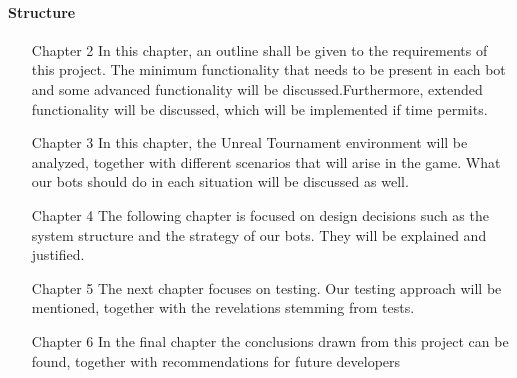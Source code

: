 \paragraph{Structure}

\begin{enumerate}
\item[Chapter 2] In this chapter, an outline shall be given to the requirements of this project. The minimum functionality that needs to be present in each bot and some advanced functionality will be discussed.Furthermore, extended functionality will be discussed, which will be implemented if time permits.

\item[Chapter 3] In this chapter, the Unreal Tournament environment will be analyzed, together with different scenarios that will arise in the game. What our bots should do in each situation will be discussed as well.

\item[Chapter 4] The following chapter is focused on design decisions such as the system structure and the strategy of our bots. They will be explained and justified.

\item[Chapter 5] The next chapter focuses on testing. Our testing approach will be mentioned, together with the revelations stemming from tests.

\item[Chapter 6] In the final chapter the conclusions drawn from this project can be found, together with recommendations for future developers
\end{enumerate}